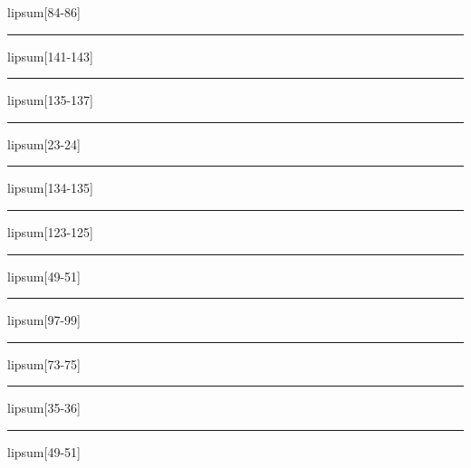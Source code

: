 \documentclass[11pt,a4paper]{article}
\begin{document}
lipsum[84-86]

\begin{simplewrap}
  \textcolor{red!39}{\rule{5.9cm}{6.3cm}}
\end{simplewrap}
lipsum[141-143]

\begin{simplewrap}
  \textcolor{magenta!21}{\rule{4.8cm}{5.7cm}}
\end{simplewrap}
lipsum[135-137]

\begin{simplewrap}
  \textcolor{magenta!29}{\rule{5.7cm}{5.9cm}}
\end{simplewrap}
lipsum[23-24]

\begin{simplewrap}
  \textcolor{lime!36}{\rule{3.8cm}{4.4cm}}
\end{simplewrap}
lipsum[134-135]

\begin{simplewrap}
  \textcolor{purple!32}{\rule{3.9cm}{6.3cm}}
\end{simplewrap}
lipsum[123-125]

\begin{simplewrap}
  \textcolor{olive!28}{\rule{4.8cm}{8.4cm}}
\end{simplewrap}
lipsum[49-51]

\begin{simplewrap}
  \textcolor{magenta!37}{\rule{4.2cm}{3.3cm}}
\end{simplewrap}
lipsum[97-99]

\begin{simplewrap}
  \textcolor{green!37}{\rule{4.9cm}{6.1cm}}
\end{simplewrap}
lipsum[73-75]

\begin{simplewrap}
  \textcolor{magenta!27}{\rule{4.2cm}{8.8cm}}
\end{simplewrap}
lipsum[35-36]

\begin{simplewrap}
  \textcolor{blue!49}{\rule{4.4cm}{7.6cm}}
\end{simplewrap}
lipsum[49-51]
\end{document}
